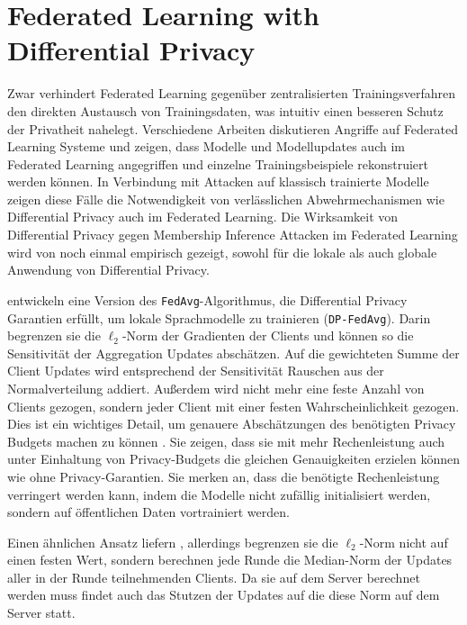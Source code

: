 \section{Federated Learning with Differential Privacy}\label{sec:rw-fldp}
Zwar verhindert Federated Learning gegenüber zentralisierten Trainingsverfahren den direkten Austausch von Trainingsdaten, was intuitiv einen besseren Schutz der Privatheit nahelegt. Verschiedene Arbeiten \cite{wang:2019, geiping:2020, ma:2020} diskutieren Angriffe auf Federated Learning Systeme und zeigen, dass Modelle und Modellupdates auch im Federated Learning angegriffen und einzelne Trainingsbeispiele rekonstruiert werden können. In Verbindung mit Attacken auf klassisch trainierte Modelle zeigen diese Fälle die Notwendigkeit von verlässlichen Abwehrmechanismen wie Differential Privacy auch im Federated Learning. Die Wirksamkeit von Differential Privacy gegen Membership Inference Attacken im Federated Learning wird von \textcite{naseri:2022} noch einmal empirisch gezeigt, sowohl für die lokale als auch globale Anwendung von Differential Privacy.

\textcite{mcmahan:2018} entwickeln eine Version des \texttt{FedAvg}-Algorithmus, die Differential Privacy Garantien erfüllt, um lokale Sprachmodelle zu trainieren (\texttt{DP-FedAvg}). Darin begrenzen sie die $\ell_2$-Norm der Gradienten der Clients und können so die Sensitivität der Aggregation Updates abschätzen. Auf die gewichteten Summe der Client Updates wird entsprechend der Sensitivität Rauschen aus der Normalverteilung addiert. Außerdem wird nicht mehr eine feste Anzahl von Clients gezogen, sondern jeder Client mit einer festen Wahrscheinlichkeit gezogen. Dies ist ein wichtiges Detail, um genauere Abschätzungen des benötigten Privacy Budgets machen zu können \cite{wang:2020}. Sie zeigen, dass sie mit mehr Rechenleistung auch unter Einhaltung von Privacy-Budgets die gleichen Genauigkeiten erzielen können wie ohne Privacy-Garantien. Sie merken an, dass die benötigte Rechenleistung verringert werden kann, indem die Modelle nicht zufällig initialisiert werden, sondern auf öffentlichen Daten vortrainiert werden.

Einen ähnlichen Ansatz liefern \textcite{geyer:2017}, allerdings begrenzen sie die $\ell_2$-Norm nicht auf einen festen Wert, sondern berechnen jede Runde die Median-Norm der Updates aller in der Runde teilnehmenden Clients. Da sie auf dem Server berechnet werden muss findet auch das Stutzen der Updates auf die diese Norm auf dem Server statt. 

